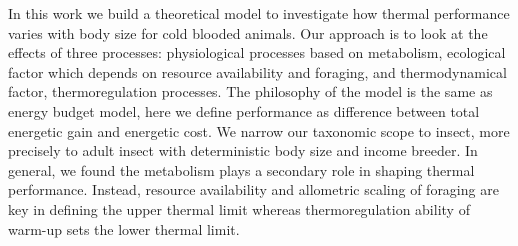 In this work we build a theoretical model to investigate how thermal performance varies with body size for cold blooded animals. 
Our approach is to look at the effects of three processes: physiological processes based on metabolism, ecological factor which depends on resource availability and foraging, and thermodynamical factor, thermoregulation processes.
The philosophy of the model is the same as energy budget model, here we define performance as difference between total energetic gain and energetic cost.
We narrow our taxonomic scope to insect, more precisely to adult insect with deterministic body size and income breeder. 
In general, we found the metabolism plays a secondary role in shaping thermal performance.
Instead, resource availability and allometric scaling of foraging are key in defining the upper thermal limit whereas thermoregulation ability of warm-up sets the lower thermal limit.
